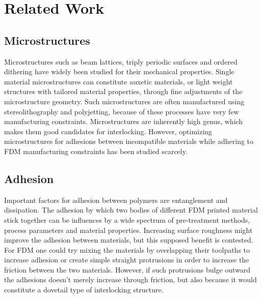 \section{Related Work}


\subsection{Microstructures}
Microstructures such as beam lattices, triply periodic surfaces and ordered dithering have widely been studied for their mechanical properties\cite{Cadman2013,Zhang2018a,tamburrino2018}.
Single material microstructures can constitute auxetic materials, or light weight structures with tailored material properties, through fine adjustments of the microstructure geometry.
Such microstructures are often manufactured using stereolithography and polyjetting, because of these processes have very few manufacturing constraints.
Microstructures are inherently high genus, which makes them good candidates for interlocking\cite{freund2019determination}.
However, optimizing microstructures for adhesions between incompatible materials while adhering to FDM manufacturing constraints has been studied scarcely.



\subsection{Adhesion}

Important factors for adhesion between polymers are entanglement and dissipation\cite{abbott2015adhesion}.
The adhesion by which two bodies of different FDM printed material stick together can be influences by a wide spectrum of pre-treatment methods, process parameters and material properties\cite{freund2019determination}.
Increasing surface roughness might improve the adhesion between materials\cite{huttenbach1991interface,gent1990model}, but this supposed benefit is contested\cite{abbott2015adhesion}.
For FDM one could try mixing the materials by overlapping their toolpaths to increase adhesion or create simple straight protrusions in order to increase the friction between the two materials\cite{tamburrino19}.
However, if such protrusions bulge outward the adhesions doesn't merely increase through friction, but also because it would constitute a dovetail type of interlocking structure.



